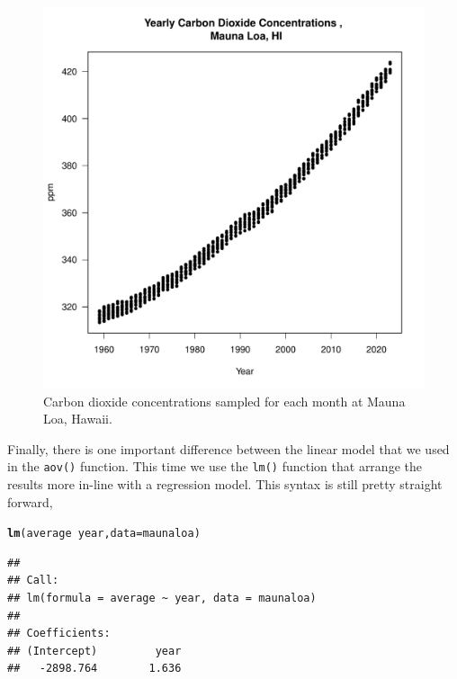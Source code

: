 \documentclass{tufte-handout}\usepackage[]{graphicx}\usepackage[]{xcolor}
\makeatletter
\def\maxwidth{ %
  \ifdim\Gin@nat@width>\linewidth
    \linewidth
  \else
    \Gin@nat@width
  \fi
}
\newcommand{\hlopt}[1]{\textcolor[rgb]{0,0,0}{#1}}%
\newcommand{\hlstd}[1]{\textcolor[rgb]{0.345,0.345,0.345}{#1}}%
\newcommand{\hlkwc}[1]{\textcolor[rgb]{0.333,0.667,0.333}{#1}}%
\newcommand{\hlkwd}[1]{\textcolor[rgb]{0.737,0.353,0.396}{\textbf{#1}}}%
\newenvironment{kframe}{%
 \def\at@end@of@kframe{}%
 \ifinner\ifhmode%
  \def\at@end@of@kframe{\end{minipage}}%
  \begin{minipage}{\columnwidth}%
 \fi\fi%
 \def\FrameCommand##1{\hskip\@totalleftmargin \hskip-\fboxsep
 \colorbox{shadecolor}{##1}\hskip-\fboxsep
     \hskip-\linewidth \hskip-\@totalleftmargin \hskip\columnwidth}%
 \MakeFramed {\advance\hsize-\width
   \@totalleftmargin\z@ \linewidth\hsize
   \@setminipage}}%
 {\par\unskip\endMakeFramed%
 \at@end@of@kframe}
\newenvironment{knitrout}{}{} %
\makeatother
\begin{document}
\begin{figure}
\label{fig:maunaloa}
\caption{Carbon dioxide concentrations sampled for each month at Mauna Loa, Hawaii.}
\begin{knitrout}
\color{fgcolor}
\includegraphics[width=\maxwidth]{figure/unnamed-chunk-52-1} 
\end{knitrout}
\end{figure}


Finally, there is one important difference between the linear model that we used in the \texttt{aov()} function. This time we use the \texttt{lm()} function that arrange the results more in-line with a regression model.
This syntax is still pretty straight forward,  

\begin{knitrout}
\color{fgcolor}\begin{kframe}
\begin{alltt}
\hlkwd{lm}\hlstd{(average} \hlopt{~} \hlstd{year,} \hlkwc{data}\hlstd{=maunaloa)}
\end{alltt}
\begin{verbatim}
## 
## Call:
## lm(formula = average ~ year, data = maunaloa)
## 
## Coefficients:
## (Intercept)         year  
##   -2898.764        1.636
\end{verbatim}
\end{kframe}
\end{knitrout}
\end{document}
